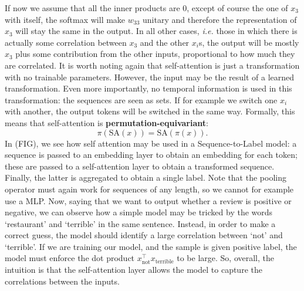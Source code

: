 If now we assume that all the inner products are $0$, except of course the one of $x_3$ with itself, the softmax will make $w_{33}$ unitary and therefore the representation of $x_3$ will stay the same in the output. 
In all other cases, \emph{i.e.} those in which there is actually some correlation between $x_3$ and the other $x_i$s, the output will be mostly $x_3$ plus some contribution from the other inputs, proportional to how much they are correlated. 
It is worth noting again that self-attention is just a transformation with no trainable parameters. However, the input may be the result of a learned transformation.
Even more importantly, no temporal information is used in this transformation: the sequences are seen as sets. If for example we switch one $x_i$ with another, the output tokens will be switched in the same way. Formally, this means that self-attention is \textbf{permutation-equivariant}:
\begin{equation}
    \pi \left( \text{SA} (x)\right) = \text{SA} \left(\pi(x)\right).
\end{equation}
In (FIG), we see how self attention may be used in a Sequence-to-Label model: a sequence is passed to an embedding layer to obtain an embedding for each token; these are passed to a self-attention layer to obtain a transformed sequence. Finally, the latter is aggregated to obtain a single label. Note that the pooling operator must again work for sequences of any length, so we cannot for example use a MLP.
Now, saying that we want to output whether a review is positive or negative, we can observe how a simple model may be tricked by the words `restaurant' and `terrible' in the same sentence. Instead, in order to make a correct guess, the model should identify a large correlation between `not' and `terrible'. If we are training our model, and the sample is given positive label, the model must enforce the dot product $x_{\text{not}}^\top x_{\text{terrible}}$ to be large. So, overall, the intuition is that the self-attention layer allows the model to capture the correlations between the inputs.

